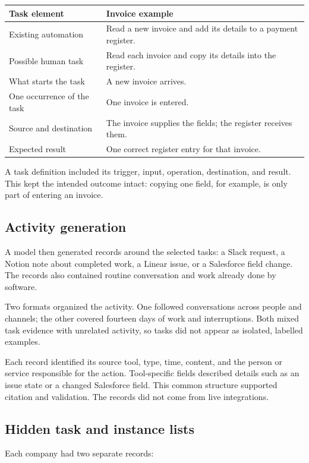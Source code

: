\documentclass[11pt]{article}
\begin{document}
\begin{center}
\small
\setlength{\tabcolsep}{4pt}
\renewcommand{\arraystretch}{1.25}
\begin{tabularx}{\linewidth}{@{}>{\raggedright\arraybackslash}X>{\raggedright\arraybackslash}X@{}}
\toprule
\textbf{Task element} & \textbf{Invoice example} \\
\midrule
Existing automation & Read a new invoice and add its details to a payment register. \\
Possible human task & Read each invoice and copy its details into the register. \\
What starts the task & A new invoice arrives. \\
One occurrence of the task & One invoice is entered. \\
Source and destination & The invoice supplies the fields; the register receives them. \\
Expected result & One correct register entry for that invoice. \\
\bottomrule
\end{tabularx}
\end{center}
A task definition included its trigger, input, operation, destination, and result. This kept the intended outcome intact: copying one field, for example, is only part of entering an invoice.

\subsection{Activity generation}
A model then generated records around the selected tasks: a Slack request, a Notion note about completed work, a Linear issue, or a Salesforce field change. The records also contained routine conversation and work already done by software.

Two formats organized the activity. One followed conversations across people and channels; the other covered fourteen days of work and interruptions. Both mixed task evidence with unrelated activity, so tasks did not appear as isolated, labelled examples.

Each record identified its source tool, type, time, content, and the person or service responsible for the action. Tool-specific fields described details such as an issue state or a changed Salesforce field. This common structure supported citation and validation. The records did not come from live integrations.

\subsection{Hidden task and instance lists}
Each company had two separate records:
\end{document}
